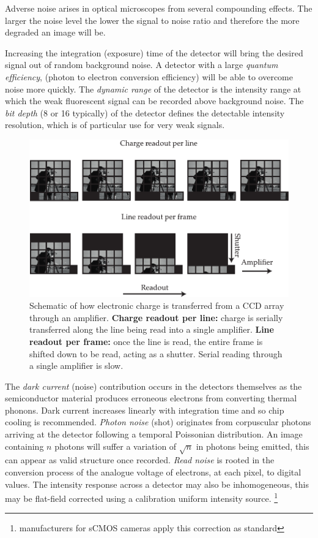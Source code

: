 Adverse noise arises in optical microscopes from several compounding effects.
The larger the noise level the lower the signal to noise ratio and therefore the more degraded an image will be.

Increasing the integration (exposure) time of the detector will bring the desired signal out of random background noise.
A detector with a large \emph{quantum efficiency}, (photon to electron conversion efficiency) will be able to overcome noise more quickly.
The \emph{dynamic range} of the detector is the intensity range at which the weak fluorescent signal can be recorded above background noise.
The \emph{bit depth} (8 or \SI{16}{\bit} typically) of the detector defines the detectable intensity resolution, which is of particular use for very weak signals.

\begin{figure}
    \centering
    \includegraphics{./sensor_chips}
    \caption{Schematic of how electronic charge is transferred from a CCD array through an amplifier.
    \textbf{Charge readout per line:} charge is serially transferred along the line being read into a single amplifier.
    \textbf{Line readout per frame:} once the line is read, the entire frame is shifted down to be read, acting as a shutter.
    Serial reading through a single amplifier is slow.}
    \label{fig:sensor_chips}
\end{figure}

The \emph{dark current} (noise) contribution occurs in the detectors themselves as the semiconductor material produces erroneous electrons from converting thermal phonons.
Dark current increases linearly with integration time and so chip cooling is recommended.
\emph{Photon noise} (shot) originates from corpuscular photons arriving at the detector following a temporal Poissonian distribution.
An image containing $n$ photons will suffer a variation of $\sqrt{n}$ in photons being emitted, this can appear as valid structure once recorded.
\emph{Read noise} is rooted in the conversion process of the analogue voltage of electrons, at each pixel, to digital values.
The intensity response across a detector may also be inhomogeneous, this may be flat-field corrected using a calibration uniform intensity source.
\footnote{manufacturers for sCMOS cameras apply this correction as standard}

